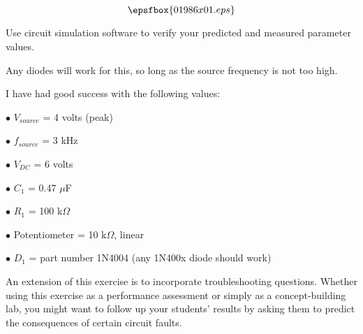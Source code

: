 

$$\epsfbox{01986x01.eps}$$

\vfil \eject






Use circuit simulation software to verify your predicted and measured parameter values.







Any diodes will work for this, so long as the source frequency is not too high.

I have had good success with the following values:

\medskip
\item{$\bullet$} $V_{source}$ = 4 volts (peak)
\item{$\bullet$} $f_{source}$ = 3 kHz
\item{$\bullet$} $V_{DC}$ = 6 volts
\item{$\bullet$} $C_1$ = 0.47 $\mu$F
\item{$\bullet$} $R_1$ = 100 k$\Omega$
\item{$\bullet$} Potentiometer = 10 k$\Omega$, linear
\item{$\bullet$} $D_1$ = part number 1N4004 (any 1N400x diode should work)
\medskip

An extension of this exercise is to incorporate troubleshooting questions.  Whether using this exercise as a performance assessment or simply as a concept-building lab, you might want to follow up your students' results by asking them to predict the consequences of certain circuit faults.




